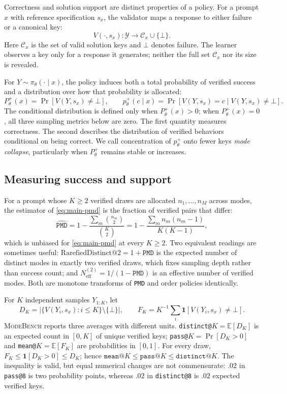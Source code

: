 \documentclass{article}
\newcommand{\1}{\mathbf 1}
\newcommand{\E}{\mathbb E}
\newcommand{\mb}{\textsc{ModeBench}}
\newcommand{\pmd}{\texttt{PMD}}
\newcommand{\neff}{\ensuremath{N^{(2)}_{\mathrm{eff}}}}
\theoremstyle{remark}
\theoremstyle{definition}
\theoremstyle{plain}
\begin{document}
Correctness and solution support are distinct properties of a policy. For a
prompt $x$ with reference specification $s_x$, the validator maps a response
to either failure or a canonical key:
\[
  V(\cdot,s_x):\mathcal Y\rightarrow \mathcal C_x\cup\{\bot\}.
\]
Here $\mathcal C_x$ is the set of valid solution keys and $\bot$ denotes
failure. The learner observes a key only for a response it generates; neither
the full set $\mathcal C_x$ nor its size is revealed.

For $Y\sim\pi_\theta(\cdot\mid x)$, the policy induces both a total probability
of verified success and a distribution over how that probability is allocated:
\[
 P_\theta^+(x)=\Pr[V(Y,s_x)\neq\bot],
 \qquad
 p_\theta^+(c\mid x)=\Pr[V(Y,s_x)=c\mid V(Y,s_x)\neq\bot].
\]
The conditional distribution is defined only when $P_\theta^+(x)>0$;
when $P_\theta^+(x)=0$, all three sampling metrics below are zero.
The first quantity measures correctness. The second describes the distribution
of verified behaviors conditional on being correct. We call concentration of
$p_\theta^+$ onto fewer keys \emph{mode collapse}, particularly when
$P_\theta^+$ remains stable or increases.

\subsection{Measuring success and support}
\label{app:metric-sampling}

For a prompt whose $K\ge2$ verified draws are allocated $n_1,\dots,n_M$ across
modes, the estimator of \eqref{eq:main-pmd} is the fraction of verified pairs
that differ:
\begin{equation}
 \widehat{\pmd}
 =1-\frac{\sum_m \binom{n_m}{2}}{\binom{K}{2}}
 =1-\frac{\sum_m n_m(n_m-1)}{K(K-1)},
 \label{eq:main-pmd-estimator}
\end{equation}
which is unbiased for \eqref{eq:main-pmd} at every $K\ge2$. Two equivalent
readings are sometimes useful: $\mathrm{RarefiedDistinct@}2=1+\pmd$ is the
expected number of distinct modes in exactly two verified draws, which fixes
sampling depth rather than success count; and $\neff=1/(1-\pmd)$ is an
effective number of verified modes. Both are monotone transforms of \pmd{} and
order policies identically.

For $K$ independent samples $Y_{1:K}$, let
\[
  D_K=\bigl|\{V(Y_i,s_x):i\le K\}\setminus\{\bot\}\bigr|,
  \qquad
  F_K=K^{-1}\sum_i \1[V(Y_i,s_x)\neq\bot].
\]
\mb{} reports three averages with different units. \texttt{distinct@}$K
=\E[D_K]$ is an expected count in $[0,K]$ of unique verified keys;
\texttt{pass@}$K=\Pr[D_K>0]$ and \texttt{mean@}$K=\E[F_K]$ are probabilities
in $[0,1]$. For every draw, $F_K\le\1[D_K>0]\le D_K$; hence
$\texttt{mean@}K\le\texttt{pass@}K\le\texttt{distinct@}K$. The inequality is
valid, but equal numerical changes are not commensurate: $.02$ in
\texttt{pass@8} is two probability points, whereas $.02$ in
\texttt{distinct@8} is $.02$ expected verified keys.
\end{document}
